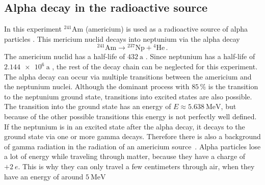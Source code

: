 \subsection{Alpha decay in the radioactive source}\label{subsec:alpha_decay}
In this experiment ${}^{241}\mathrm{Am}$ (americium) is used as a radioactive source of alpha particles \cite{V16}. 
\newline
This mericium nuclid decays into neptunium via the alpha decay \cite{periodensystem_online}
\begin{equation*}
    {}^{241}\mathrm{Am} \rightarrow {}^{237}\mathrm{Np} + {}^4\mathrm{He} \, .
\end{equation*}
The americium nuclid has a half-life of $\qty{432}{\text{a}}$ \cite[4]{leo_1994}.
Since neptunium has a half-life of $\qty{2.144e6}{\text{a}}$ \cite{periodensystem_online}, the rest of the decay chain can be neglected for this experiment. 
%
\newline
The alpha decay can occur via multiple transitions between the americium and the neptunium nuclei.
Although the dominant process with $85 \, \%$ is the transition to the neptunium ground state, transitions into excited states are also possible. 
The transition into the ground state has an energy of $E \approx \qty{5.638}{\mega\electronvolt}$, 
but because of the other possible transitions this energy is not perfectly well defined. 
If the neptunium is in an excited state after the alpha decay, it decays to the ground state via one or more gamma decays. 
Therefore there is also a background of gamma radiation in the radiation of an americium source~\cite[2-6]{leo_1994}.
\newline
Alpha particles lose a lot of energy while traveling through matter, because they have a charge of $+\qty{2}{\elementarycharge}$. 
This is why they can only travel a few centimeters through air, when they have an energy of around $\qty{5}{\mega\electronvolt}$ \cite[4]{leo_1994}
